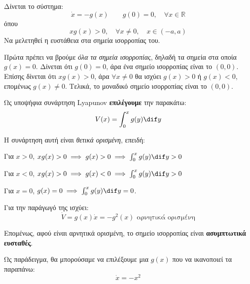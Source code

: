 \documentclass[11pt,a4paper,notitlepage,fleqn]{article}
\begin{document}
\begin{exercise}
	Δίνεται το σύστημα:
	\[
	\dot x = -g(x) \qquad g(0) = 0,\quad \forall x \in \mathbb R
	\]
	όπου
	\[
	xg(x) > 0,\quad \forall x\neq 0,\quad x\in (-a,a)
	\]
	Να μελετηθεί η ευστάθεια στα σημεία ισορροπίας του.

	\tcblower

	Πρώτα πρέπει να βρούμε \textit{όλα τα σημεία ισορροπίας}, δηλαδή τα σημεία
	στα οποία \( g(x) = 0 \). Δίνεται ότι \( g(0) = 0 \), άρα ένα σημείο ισορροπίας
	είναι το \( (0,0) \). Επίσης δίνεται ότι \( xg(x) > 0 \), άρα \( \forall x \neq 0 \)
	θα ισχύει \( g(x) > 0 \) ή \( g(x) <0 \), επομένως \( g(x) \neq 0 \). Τελικά,
	το μοναδικό σημείο ισορροπίας είναι το \( (0,0) \).

	Ως υποψήφια συνάρτηση Lyapunov \textbf{επιλέγουμε} την παρακάτω:
	\[
	V(x) = \int_0^x g(y) \dif y
	\]

	Η συνάρτηση αυτή είναι \textit{θετικά ορισμένη}, επειδή: \begin{inparaenum}[(a)]
		\item Για \( x>0 \), \( xg(x) > 0 \implies g(x) > 0 \implies \int_{0}^{x} g(y)\dif y > 0\)
		\item Για \( x<0 \), \( xg(x) > 0 \implies g(x) < 0 \implies \int_{0}^{x} g(y)\dif y > 0 \)
		\item Για \( x=0 \), \( g(x) = 0 \implies \int_0^x g(y)\dif y = 0 \).
	\end{inparaenum}

	Για την παράγωγό της ισχύει:
	\[
	\dot V = g(x)\dot x = -g^2(x) \text{ αρνητικά ορισμένη}
	\]

	Επομένως, αφού είναι αρνητικά ορισμένη, το σημείο ισορροπίας είναι \textbf{ασυμπτωτικά ευσταθές}.

	Ως παράδειγμα, θα μπορούσαμε να επιλέξουμε μια \( g(x) \) που να ικανοποιεί τα
	παραπάνω:
	\[
	\dot x = -x^2
	\]
\end{exercise}
\end{document}
